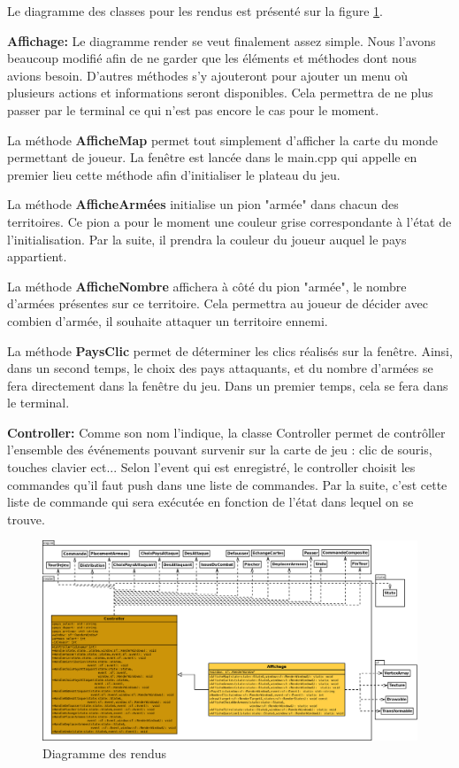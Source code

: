 Le diagramme des classes pour les rendus est présenté sur la figure \ref{fig:render}.
\newline

\textbf{Affichage:} Le diagramme render se veut finalement assez simple. Nous l'avons beaucoup modifié afin de ne garder que les éléments et méthodes dont nous avions besoin. 
D'autres méthodes s'y ajouteront pour ajouter un menu où plusieurs actions et informations seront disponibles. Cela permettra de ne plus passer par le terminal ce qui n'est pas encore le cas pour le moment. 
\newline 

La méthode \textbf{AfficheMap} permet tout simplement d'afficher la carte du monde permettant de joueur. La fenêtre est lancée dans le main.cpp qui appelle en premier lieu cette méthode afin d'initialiser le plateau du jeu. 
\newline 

La méthode \textbf{AfficheArmées} initialise un pion "armée" dans chacun des territoires. Ce pion a pour le moment une couleur grise correspondante à l'état de l'initialisation. Par la suite, il prendra la couleur du joueur auquel le pays appartient.  
\newline 

La méthode \textbf{AfficheNombre} affichera à côté du pion "armée", le nombre d'armées présentes sur ce territoire. Cela permettra au joueur de décider avec combien d'armée, il souhaite attaquer un territoire ennemi. 
\newline

La méthode \textbf{PaysClic} permet de déterminer les clics réalisés sur la fenêtre. Ainsi, dans un second temps, le choix des pays attaquants, et du nombre d'armées se fera directement dans la fenêtre du jeu. Dans un premier temps, cela se fera dans le terminal. 
\newline 

\textbf{Controller:} Comme son nom l'indique, la classe Controller permet de contrôller l'ensemble des événements pouvant survenir sur la carte de jeu : clic de souris, touches clavier ect... 
Selon l'event qui est enregistré, le controller choisit les commandes qu'il faut push dans une liste de commandes. Par la suite, c'est cette liste de commande qui sera exécutée en fonction de l'état dans lequel on se trouve. 
\newline

\begin{landscape}
    \begin{figure}[!htbp]
        \centering
        \includegraphics[width=21cm]{Images/render.png}
        \caption{Diagramme des rendus}
        \label{fig:render}
    \end{figure}
\end{landscape}